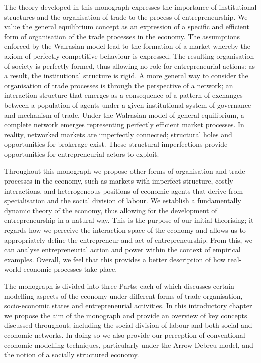 The theory developed in this monograph expresses the importance of institutional structures and the organisation of trade to the process of entrepreneurship. We value the general equilibrium concept as an expression of a specific and efficient form of organisation of the trade processes in the economy. The assumptions enforced by the Walrasian model lead to the formation of a market whereby the axiom of perfectly competitive behaviour is expressed. The resulting organisation of society is perfectly formed, thus allowing no role for entrepreneurial actions: as a result, the institutional structure is rigid. A more general way to consider the organisation of trade processes is through the perspective of a network; an interaction structure that emerges as a consequence of a pattern of exchanges between a population of agents under a given institutional system of governance and mechanism of trade. Under the Walrasian model of general equilibrium, a complete network emerges representing perfectly efficient market processes. In reality, networked markets are imperfectly connected; structural holes and opportunities for brokerage exist. These structural imperfections provide opportunities for entrepreneurial actors to exploit.

Throughout this monograph we propose other forms of organisation and trade processes in the economy, such as markets with imperfect structure, costly interactions, and heterogeneous positions of economic agents that derive from specialisation and the social division of labour. We establish a fundamentally dynamic theory of the economy, thus allowing for the development of entrepreneurship in a natural way. This is the purpose of our initial theorising; it regards how we perceive the interaction space of the economy and allows us to appropriately define the entrepreneur and act of entrepreneurship. From this, we can analyse entrepreneurial action and power within the context of empirical examples. Overall, we feel that this provides a better description of how real-world economic processes take place.

The monograph is divided into three Parts; each of which discusses certain modelling aspects of the economy under different forms of trade organisation, socio-economic states and entrepreneurial activities. In this introductory chapter we propose the aim of the monograph and provide an overview of key concepts discussed throughout; including the social division of labour and both social and economic networks. In doing so we also provide our perception of conventional economic modelling techniques, particularly under the Arrow-Debreu model, and the notion of a socially structured economy.

